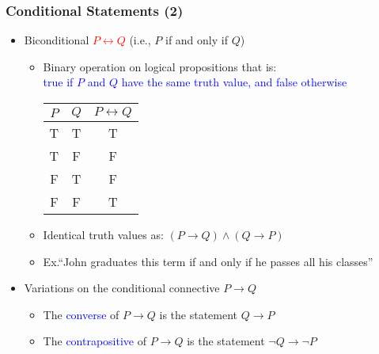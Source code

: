 \documentclass[10pt,english]{beamer}
\begin{document}
\begin{frame} \frametitle{Conditional Statements (2)}

\begin{itemize}

\item Biconditional \textcolor{red}{$P \leftrightarrow Q$} (i.e., $P$ if and only if $Q$)

\begin{itemize}
  \setlength\itemsep{1.5mm}
  \item Binary operation on logical propositions that is:\\ \hspace{2mm} \textcolor{blue}{true if $P$ and $Q$ have the same truth value, and false otherwise} \vspace{1mm} \\
   
  \begin{center}
  \begin{tabular}{|c|c|c|}
  \hline
  $P$ & $Q$ & $P \leftrightarrow Q$ \\
  \hline
  T & T & T \\
  T & F & F \\
  F & T & F \\
  F & F & T \\
  \hline
  \end{tabular}
  \end{center} 
  \vspace{1mm}

  \item Identical truth values as: $(P \rightarrow Q) \wedge (Q \rightarrow P)$
  
  \item Ex.``John graduates this term if and only if he passes all his classes''
  
\end{itemize}

\vspace{1mm}

\item Variations on the conditional connective $P \rightarrow Q$

\begin{itemize}
  \setlength\itemsep{2mm}
  \item The \textcolor{blue}{converse} of $P \rightarrow Q$ is the statement $Q \rightarrow P$
  \item The \textcolor{blue}{contrapositive} of $P \rightarrow Q$ is the statement $\neg Q \rightarrow \neg P$
\end{itemize}

\end{itemize}

\end{frame}
\end{document}
